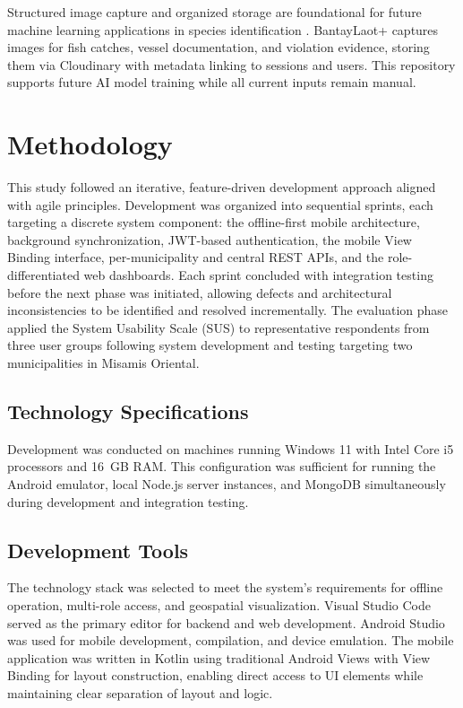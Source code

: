 \documentclass[journal]{IEEEtran}
\begin{document}
Structured image capture and organized storage are foundational for future machine
learning applications in species identification \cite{Norouzzadeh2018}. BantayLaot+
captures images for fish catches, vessel documentation, and violation evidence, storing
them via Cloudinary with metadata linking to sessions and users. This repository supports
future AI model training while all current inputs remain manual.


\section{Methodology}

This study followed an iterative, feature-driven development approach
aligned with agile principles. Development was organized into sequential sprints, each
targeting a discrete system component: the offline-first mobile architecture, background
synchronization, JWT-based authentication, the mobile View Binding interface,
per-municipality and central REST APIs, and the role-differentiated web dashboards. Each
sprint concluded with integration testing before the next phase was initiated, allowing
defects and architectural inconsistencies to be identified and resolved incrementally.
The evaluation phase applied the System Usability Scale (SUS) to representative
respondents from three user groups following system development and testing targeting
two municipalities in Misamis Oriental.

\subsection{Technology Specifications}

Development was conducted on machines running Windows 11 with Intel Core i5 processors
and 16~GB RAM. This configuration was sufficient for running the Android emulator, local
Node.js server instances, and MongoDB simultaneously during development and integration
testing.

\subsection{Development Tools}

The technology stack was selected to meet the system's requirements for offline operation,
multi-role access, and geospatial visualization. Visual Studio Code served as the primary
editor for backend and web development. Android Studio was used for mobile development,
compilation, and device emulation. The mobile application was written in Kotlin using
traditional Android Views with View Binding for layout construction, enabling direct
access to UI elements while maintaining clear separation of layout and logic.
\end{document}
